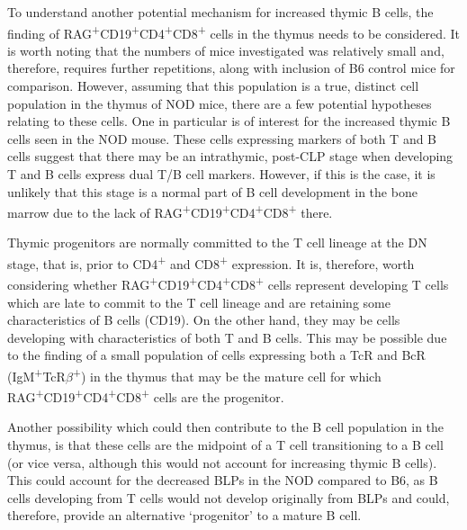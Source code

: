 To understand another potential mechanism for increased thymic B cells, the finding of RAG\textsuperscript{+}CD19\textsuperscript{+}CD4\textsuperscript{+}CD8\textsuperscript{+} cells in the thymus needs to be considered.
It is worth noting that the numbers of mice investigated was relatively small and, therefore, requires further repetitions, along with inclusion of B6 control mice for comparison.
However, assuming that this population is a true, distinct cell population in the thymus of NOD mice, there are a few potential hypotheses relating to these cells.
One in particular is of interest for the increased thymic B cells seen in the NOD mouse.
These cells expressing markers of both T and B cells suggest that there may be an intrathymic, post-CLP stage when developing T and B cells express dual T/B cell markers.
However, if this is the case, it is unlikely that this stage is a normal part of B cell development in the bone marrow due to the lack of RAG\textsuperscript{+}CD19\textsuperscript{+}CD4\textsuperscript{+}CD8\textsuperscript{+} there.

Thymic progenitors are normally committed to the T cell lineage at the DN stage, that is, prior to CD4\textsuperscript{+} and CD8\textsuperscript{+} expression.
It is, therefore, worth considering whether RAG\textsuperscript{+}CD19\textsuperscript{+}CD4\textsuperscript{+}CD8\textsuperscript{+}  cells represent developing T cells which are late to commit to the T cell lineage and are retaining some characteristics of B cells (CD19).
On the other hand, they may be cells developing with characteristics of both T and B cells.
This may be possible due to the finding of a small population of cells expressing both a TcR and BcR (IgM\textsuperscript{+}TcR$\beta$\textsuperscript{+}) in the thymus that may be the mature cell for which RAG\textsuperscript{+}CD19\textsuperscript{+}CD4\textsuperscript{+}CD8\textsuperscript{+} cells are the progenitor.

Another possibility which could then contribute to the B cell population in the thymus, is that these cells are the midpoint of a T cell transitioning to a B cell (or vice versa, although this would not account for increasing thymic B cells).
This could account for the decreased BLPs in the NOD compared to B6, as B cells developing from T cells would not develop originally from BLPs and could, therefore, provide an alternative `progenitor' to a mature B cell.


